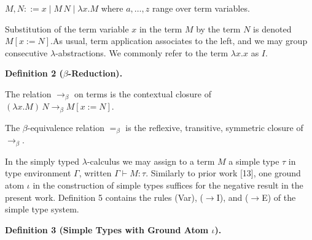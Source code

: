 \documentclass[10pt,a4paper]{amsart}
\begin{document}
$M,N::=x\mid M\,N\mid\lambda x.M$ where $a,\ldots,z$ range over term variables.\par
 
 
 
 
Substitution of the term variable $x$ in the term $M$ by the term $N$ is denoted $M[x:=N]$.As usual, term application associates to the left, and we may group consecutive $\lambda$-abstractions. We commonly refer to the term $\lambda x.x$ as $I$.\par
 
 
 
\par\medskip\noindent\textbf{Definition 2 ($\beta$-Reduction).}\par
 
 
The relation $\to_{\beta}$ on terms is the contextual closure of $(\lambda x.M)\,N\to_{\beta}M[x:=N]$.\par
 
 
 
 
The $\beta$-equivalence relation $=_{\beta}$ is the reflexive, transitive, symmetric closure of $\to_{\beta}$.\par
 
 
 
In the simply typed $\lambda$-calculus we may assign to a term $M$ a simple type $\tau$ in type environment $\Gamma$, written $\Gamma\vdash M:\tau$. Similarly to prior work [13], one ground atom $\iota$ in the construction of simple types suffices for the negative result in the present work. Definition 5 contains the rules (Var), ($\to$I), and ($\to$E) of the simple type system.\par
 
  
 
\par\medskip\noindent\textbf{Definition 3 (Simple Types with Ground Atom $\iota$).}\par
 
 
\end{document}
